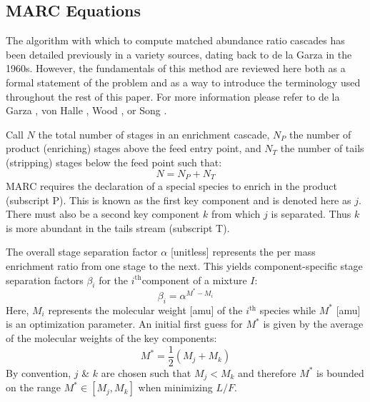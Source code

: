 \documentclass[preprint,12pt]{elsarticle}
\newcommand{\superscript}[1]{\ensuremath{^{\textrm{#1}}}}
\newcommand{\ith}[0]{$i$\superscript{th}}
\begin{document}
\subsection{MARC Equations}
\label{sec:marceq}
The algorithm with which to compute matched abundance ratio cascades has been 
detailed previously in a variety sources, dating back to de la Garza in the
1960s. However, the fundamentals of this method are reviewed here both as a formal
statement of the problem and as a way to introduce the terminology used throughout 
the rest of this paper.  For more information please refer to de la Garza
\cite{DelaGarza1969}, von Halle \cite{VonHalle1987}, Wood \cite{Wood1999}, or 
Song \cite{doi:10.1080/01496391003793884}.

Call $N$ the total number of stages in an enrichment cascade, $N_P$ the number of 
product (enriching) stages above the feed entry point, and $N_T$ the number of tails
(stripping) stages below the feed point such that:
\begin{equation}
N = N_P + N_T
\end{equation}
MARC requires the declaration of a special species to enrich in the 
product (subscript P).  This is known as the first key component and is denoted 
here as $j$.  There must also be a second key component $k$ from which $j$ is 
separated. Thus $k$ is more abundant in the tails stream (subscript T).

The overall stage separation factor $\alpha$ [unitless] represents the per mass 
enrichment ratio from one stage to the next.  This yields component-specific
stage separation factors $\beta_i$ for the \ith component of a mixture $I$:
\begin{equation}
\beta_i = \alpha^{M^* - M_i}
\label{beta_i}
\end{equation}
Here, $M_i$ represents the molecular weight [amu] of the \ith
species while $M^*$ [amu] is an optimization parameter.  An initial first guess for 
$M^*$ is given by the average of the molecular weights of the key components:
\begin{equation}
M^* = \frac{1}{2}\left(M_j + M_k\right)
\label{mstar-guess}
\end{equation}
By convention, $j$ \& $k$ are chosen such that $M_j < M_k$ and 
therefore $M^*$ is bounded on the range $M^*\in[M_j,M_k]$ when minimizing $L/F$.
\end{document}
